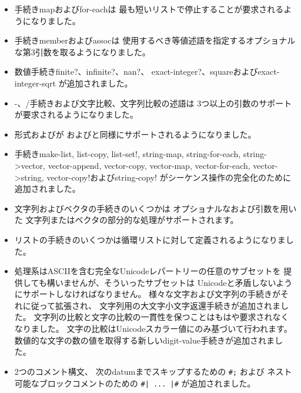 \begin{itemize}
\item 手続き{\cf map}および{\cf for-each}は
最も短いリストで停止することが要求されるようになりました。

\item 手続き{\cf member}および{\cf assoc}は
使用するべき等値述語を指定するオプショナルな第3引数を取るようになりました。

\item 数値手続き{\cf finite?}、{\cf infinite?}、{\cf nan?}、
{\cf exact-\+integer?}、{\cf square}および{\cf exact-\+integer-\+sqrt}
が追加されました。

\item {\cf -}、{\cf /}手続きおよび文字比較、文字列比較の述語は
3つ以上の引数のサポートが要求されるようになりました。

\item 形式\sharptrue{}および\sharpfalse{}が
\schtrue{}および\schfalse{}と同様にサポートされるようになりました。

\item 手続き{\cf make-\+list}, {\cf list-\+copy}, {\cf list-\+set!},
{\cf string-\+map}, {\cf string-\+for-\+each}, {\cf string->\+vector}, 
{\cf vector-\+append},
{\cf vector-\+copy}, {\cf vector-\+map}, {\cf vector-\+for-\+each}, 
{\cf vector->\+string}, {\cf vector-\+copy!}および{\cf string-\+copy!}
がシーケンス操作の完全化のために追加されました。

\item 文字列およびベクタの手続きのいくつかは
オプショナルなおよび引数を用いた
文字列またはベクタの部分的な処理がサポートされます。

\item リストの手続きのいくつかは循環リストに対して定義されるようになりました。

\item 処理系はASCIIを含む完全なUnicodeレパートリーの任意のサブセットを
提供しても構いませんが、そういったサブセットは
Unicodeと矛盾しないようにサポートしなければなりません。
様々な文字および文字列の手続きがそれに従って拡張され、
文字列用の大文字小文字返還手続きが追加されました。
文字列の比較と文字の比較の一貫性を保つことはもはや要求されなくなりました。
文字の比較はUnicodeスカラー値にのみ基づいて行われます。
数値的な文字の数の値を取得する新しい{\cf digit-value}手続きが追加されました。

\item 2つのコメント構文、
次のdatumまでスキップするための {\tt \#;} および
ネスト可能なブロックコメントのための {\tt \#| ... |\#}
が追加されました。


\end{itemize}
